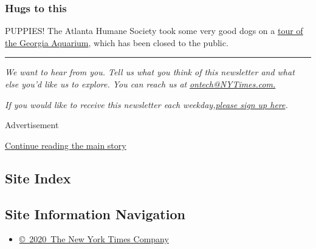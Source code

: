 \hypertarget{hugs-to-this}{%
\subsubsection{Hugs to this}\label{hugs-to-this}}

PUPPIES! The Atlanta Humane Society took some very good dogs on a
\href{https://twitter.com/atlantahumane/status/1243218832581447683}{tour
of the Georgia Aquarium}, which has been closed to the public.

\begin{center}\rule{0.5\linewidth}{\linethickness}\end{center}

\emph{We want to hear from you. Tell us what you think of this
newsletter and what else you'd like us to explore. You can reach us at}
\href{mailto:ontech@NYTimes.com?subject=On\%20Tech\%20Feedback}{\emph{ontech@NYTimes.com.}}

\emph{If you would like to receive this newsletter each
weekday,}\href{https://nl.nytimes3xbfgragh.onion/f/a/PLwk0gEp9CAyb88oA51ILQ~~/AAAAAQA~/RgRgby-OP0TQaHR0cHM6Ly93d3cubnl0aW1lcy5jb20vbmV3c2xldHRlcnMvc2lnbnVwL09UP2NhbXBhaWduX2lkPTE1OCZlbWM9ZWRpdF9vdF8yMDIwMDQwNyZpbnN0YW5jZV9pZD0xNzQ0NSZubD1vbi10ZWNoLXdpdGgtc2hpcmEtb3ZpZGUmcmVnaV9pZD02NzA0NzE1NCZzZWdtZW50X2lkPTI0MTgyJnRlPTEmdXNlcl9pZD00Y2RmZDMyYzc3Zjg0ZDc3MzRkNzZjYjA4ODIwNjA4YlcDbnl0QgoAKo6qjF5xBcb0UhhoYW5uYS5pbmdiZXJAbnl0aW1lcy5jb21YBAAAAAA~}{\emph{please
sign up here}}\emph{.}

Advertisement

\protect\hyperlink{after-bottom}{Continue reading the main story}

\hypertarget{site-index}{%
\subsection{Site Index}\label{site-index}}

\hypertarget{site-information-navigation}{%
\subsection{Site Information
Navigation}\label{site-information-navigation}}

\begin{itemize}
\tightlist
\item
  \href{https://help.nytimes3xbfgragh.onion/hc/en-us/articles/115014792127-Copyright-notice}{©~2020~The
  New York Times Company}
\end{itemize}

